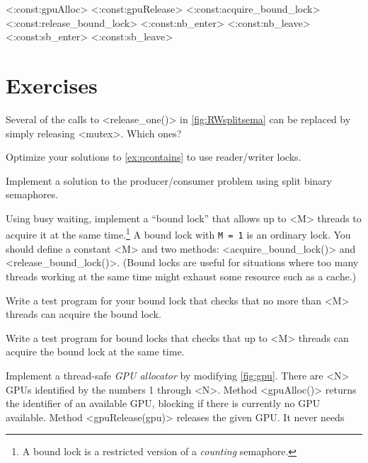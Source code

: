 \documentclass{report}
\begin{document}
<{:const:gpuAlloc}>
<{:const:gpuRelease}>
<{:const:acquire_bound_lock}>
<{:const:release_bound_lock}>
<{:const:nb_enter}>
<{:const:nb_leave}>
<{:const:sb_enter}>
<{:const:sb_leave}>

\section*{Exercises}
\begin{problems}
\item Several of the calls to <{release_one()}> in
\autoref{fig:RWsplitsema} can be replaced by simply releasing <{mutex}>.
Which ones?
\item Optimize your solutions to \autoref{ex:qcontains} to use reader/writer locks.
\item \label{ex:bbsbs} Implement a solution to the producer/consumer problem
using split binary semaphores.
\item \label{ex:boundlock} Using busy waiting, implement a ``bound lock'' that allows
up to <{M}> threads to acquire it at the same time.\footnote{A bound lock is a restricted version of a \emph{counting} semaphore.}
A bound lock
with \texttt{M = 1} is an ordinary lock.
You should define a constant <{M}> and two methods:
<{acquire_bound_lock()}> and <{release_bound_lock()}>.
(Bound locks are useful for situations where too many threads working
at the same time might exhaust some resource such as a cache.)
\item Write a test program for your bound lock
that checks that no more than <{M}> threads can acquire the
bound lock.
\item Write a test program for bound locks
that checks that up to <{M}> threads
can acquire the bound lock at the same time.
\item \label{ex:gpu} Implement a thread-safe \emph{GPU allocator} by modifying
\autoref{fig:gpu}.
There are <{N}> GPUs identified by the numbers
1 through <{N}>.  Method <{gpuAlloc()}> returns the identifier
of an available GPU, blocking if there is currently no GPU available.
Method <{gpuRelease(gpu)}> releases the given GPU.  It never needs

\end{problems}
\end{document}
